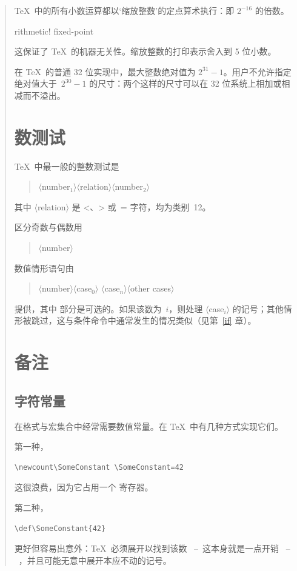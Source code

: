 \documentclass[a4paper]{rapport3}
\def\gr#1{$\langle$#1$\rangle$}\def\key#1{{\tt#1}}
\def\ldash{\unskip\ --\nobreak\ \ignorespaces}
\def\rdash{\unskip\nobreak\ --\ \ignorespaces}
\newenvironment{disp}{\begin{quotation}}{\end{quotation}}
\def\term#1\par{\index{#1}}
\begin{document}
\begin{disp}
\TeX\ 中的所有小数运算都以`缩放整数'的定点算术执行：即 $2^{-16}$ 的倍数。
\term arithmetic! fixed-point\par
这保证了 \TeX\ 的机器无关性。缩放整数的打印表示舍入到 5 位小数。

在 \TeX\ 的普通 32 位实现中，最大整数绝对值为 $2^{31}-1$。用户不允许指定绝对值大于~$2^{30}-1$ 的尺寸：两个这样的尺寸可以在 32 位系统上相加或相减而不溢出。

\section{数测试}

\TeX\ 中最一般的整数测试是
\begin{disp}\gr{number$_1$}\gr{relation}\gr{number$_2$}\end{disp}
其中 \gr{relation} 是 \n<、\n> 或~\n= 字符，均为类别~12。

区分奇数与偶数用
\begin{disp}\gr{number}\end{disp}

数值情形语句由
\begin{disp}\gr{number}\gr{case$_0$}%
     \gr{case$_n$}\gr{other cases}\end{disp}
提供，其中  部分是可选的。如果该数为~$i$，则处理 \gr{case$_i$} 的记号；其他情形被跳过，这与条件命令中通常发生的情况类似（见第~\ref{if} 章）。

\section{备注}

\subsection{字符常量}

在格式与宏集合中经常需要数值常量。在 \TeX\ 中有几种方式实现它们。
\awp

第一种，
\begin{verbatim}
\newcount\SomeConstant \SomeConstant=42
\end{verbatim}
这很浪费，因为它占用一个  寄存器。

第二种，
\begin{verbatim}
\def\SomeConstant{42}
\end{verbatim}
更好但容易出意外：\TeX\ 必须展开以找到该数
 \ldash 这本身就是一点开销 \rdash ，并且可能无意中展开本应不动的记号。


\end{disp}
\end{document}
